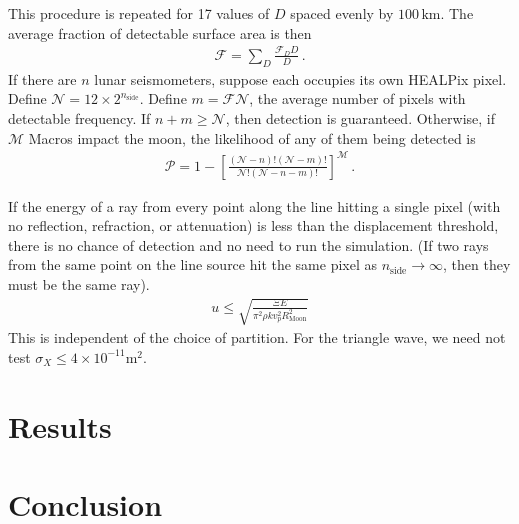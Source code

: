 \documentclass[prd,reprint,10pt,tightenlines]{revtex4-1}
\newcommand*\scr[1]{\mathscr{#1}}
\newcommand*\te[1]{\text{#1}}
\newcommand*\ps[1]{\left[#1\right]}
\newcommand*\f[2]{\frac{#1}{#2}}
\begin{document}
This procedure is repeated for 17 values of $D$ spaced evenly by $100\,\te{km}$. The average fraction of detectable surface area is then
\begin{align}
\scr F = \sum_D\f{\scr F_D D}{D}\,.
\end{align}
If there are $n$ lunar seismometers, suppose each occupies its own HEALPix pixel. Define $\scr N = 12\times 2^{n_\te{side}}$. Define $m = \scr F\scr N$, the average number of pixels with detectable frequency. If $n+m\geq \scr N$, then detection is guaranteed. Otherwise, if $\scr M$ Macros impact the moon, the likelihood of any of them being detected is
\begin{align}
\scr P = 1-\ps{\f{(\scr N-n)!(\scr N-m)!}{\scr{N}!(\scr N-n-m)!}}^{\scr M}\,.
\end{align}

If the energy of a ray from every point along the line hitting a single pixel (with no reflection, refraction, or attenuation) is less than the displacement threshold, there is no chance of detection and no need to run the simulation. (If two rays from the same point on the line source hit the same pixel as $n_\te{side}\to\infty$, then they must be the same ray).
\begin{align}
u\leq\sqrt{\f{\Xi E}{\pi^2\rho k v_p^2 R_\te{Moon}^2}}
\end{align}
This is independent of the choice of partition. For the triangle wave, we need not test $\sigma_X\leq 4\times 10^{-11}\te{m}^2$.
\section{Results}

\section{Conclusion}
\end{document}

